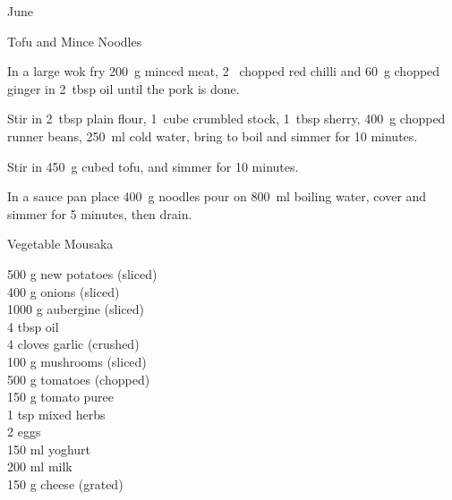 \begin{menu}{June}
\begin{recipe}{2}{Tofu and Mince Noodles}
    \begin{instructions}
    \item 
        In a large wok fry
        200~g  minced meat,
        2~ chopped red chilli
        and
        60~g chopped ginger
        in
        2~tbsp  oil
        until the pork is done.
      \item 
        Stir in
        2~tbsp  plain flour,
        1~cube crumbled stock,
        1~tbsp  sherry,
        400~g chopped runner beans,
        250~ml  cold water,
        bring to boil
        and
        simmer for 10 minutes.
      \item 
        Stir in
        450~g cubed tofu,
        and
        simmer for 10 minutes.
      \item 
    In a
    sauce pan
    place
    400~g  noodles
    pour on
    800~ml  boiling water,
    cover and simmer for 5 minutes, then drain.
  
    \end{instructions}
    \end{recipe}%
  
    \begin{recipe}{2}{Vegetable Mousaka}%
		\begin{ingredients}
		500 g new potatoes (sliced) \\
	400 g onions (sliced) \\
	1000 g aubergine (sliced) \\
	4 tbsp oil  \\
	4 cloves garlic (crushed) \\
	100 g mushrooms (sliced) \\
	500  g tomatoes (chopped) \\
	150 g tomato puree  \\
	1 tsp mixed herbs  \\
	2  eggs  \\
	150 ml yoghurt  \\
	200 ml milk  \\
	150 g cheese (grated) \\
	
		\end{ingredients}
	
	

\end{recipe}
\end{menu}
